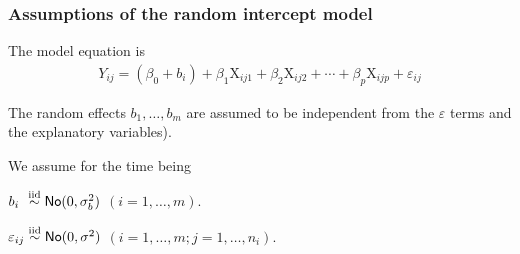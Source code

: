 \documentclass{beamer}
\begin{document}
\begin{frame}[fragile]
\frametitle{Assumptions of the random intercept model}
The model equation is
\begin{align*}
Y_{ij}=(\beta_0+b_i)+ \beta_1 \mathrm{X}_{ij1}+\beta_2\mathrm{X}_{ij2}+\cdots+\beta_p\mathrm{X}_{ijp} + \varepsilon_{ij}
\end{align*}
\bi
\item The random effects $b_1, \ldots, b_m$ are assumed to be \alert{independent} from the $\varepsilon$ terms and the explanatory variables).
\item We assume for the time being
\bi \item $b_{i\phantom{j}}\stackrel{\textnormal{iid}}{\sim} \mathsf{No}(0, \sigma^2_b)$ $(i=1, \ldots, m)$.
\item $\varepsilon_{ij}\stackrel{\textnormal{iid}}{\sim} \mathsf{No}(0, \sigma^2)$  $(i=1, \ldots, m; j = 1, \ldots, n_i)$.
\ei
\ei
\end{frame}
\end{document}
